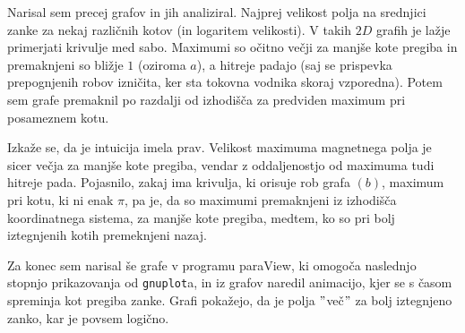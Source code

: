 \documentclass[12pt, a4paper]{article}
\begin{document}
Narisal sem precej grafov in jih analiziral. Najprej velikost polja na srednjici zanke za nekaj različnih kotov (in logaritem velikosti). V takih $2D$ grafih je lažje primerjati krivulje med sabo. Maximumi so očitno večji za manjše kote pregiba in premaknjeni so bližje $1$ (oziroma $a$), a hitreje padajo (saj se prispevka prepognjenih robov izničita, ker sta tokovna vodnika skoraj vzporedna). Potem sem grafe premaknil po razdalji od izhodišča za predviden maximum pri posameznem kotu.

Izkaže se, da je intuicija imela prav. Velikost maximuma magnetnega polja je sicer večja za manjše kote pregiba, vendar z oddaljenostjo od maximuma tudi hitreje pada. Pojasnilo, zakaj ima krivulja, ki orisuje rob grafa $(b)$, maximum pri kotu, ki ni enak $\pi$, pa je, da so maximumi premaknjeni iz izhodišča koordinatnega sistema, za manjše kote pregiba, medtem, ko so pri bolj iztegnjenih kotih premeknjeni nazaj.


Za konec sem narisal še grafe v programu paraView, ki omogoča naslednjo stopnjo prikazovanja od \texttt{gnuplot}a, in iz grafov naredil animacijo, kjer se s časom spreminja kot pregiba zanke. Grafi pokažejo, da je polja $"$več$"$ za bolj iztegnjeno zanko, kar je povsem logično. 

\begin{comment}
    \begin{subfigure}[b]{0.49\textwidth}
    \centering
    \texttt{[image: grafi1/absh\_sos\_prav200.pdf]}
    \label{graf}
  \end{subfigure}
  \begin{subfigure}[b]{0.49\textwidth}
    \centering
    \texttt{[image: grafi1/absh\_sos\_log2.pdf]}
    \label{graf}
  \end{subfigure}
\end{comment}
\end{document}

